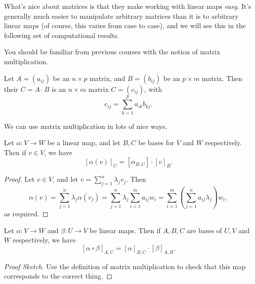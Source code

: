 What's nice about matrices is that they make working with linear maps \emph{easy}. It's generally much easier to manipulate arbitrary matrices than it is to arbitrary linear maps (of course, this varies from case to case), and we will see this in the following set of computational results.

You should be familiar from previous courses with the notion of matrix multiplication.

\begin{definition}
    Let $A = (a_{ij})$ be an $n \times p$ matrix, and $B = (b_{ij})$ 
    be an $p \times m$ matrix.
    Then their  $C = A\cdot B$ is an $n \times m$ matrix $C = (c_{ij})$, with
    $$
    c_{ij} = \sum_{k = 1}^p a_{ik}b_{kj}.
    $$
\end{definition}

We can use matrix multiplication in lots of nice ways.

\begin{lemma}
    Let $\alpha: V \rightarrow W$ be a linear map, and let $B, C$ be bases for $V$ and $W$ respectively. Then if $v \in V$, we have
    $$
    [\alpha(v)]_C = [\alpha_{B,C}] \cdot [v]_B.
    $$
\end{lemma}
\begin{proof}
    Let $v \in V$, and let $v = \sum_{j = 1}^n \lambda_j v_j$. Then
    $$
    \alpha(v) = \sum_{j = 1}^n \lambda_j \alpha(v_j) = \sum_{j = 1}^n \lambda_j \sum_{i = 1}^m a_{ij} w_i = \sum_{i = 1}^m \left(\sum_{j = 1}^n a_{ij} \lambda_j\right) w_i,
    $$
    as required.
\end{proof}

\begin{lemma}
    Let $\alpha: V \rightarrow W$ and $\beta: U \rightarrow V$ be linear maps. Then if $A, B, C$ are bases of $U, V$ and $W$ respectively, we have 
    $$
    [\alpha \circ \beta]_{A, C} = [\alpha]_{B, C} \cdot [\beta]_{A, B}.
    $$
\end{lemma}
\begin{proof}[Proof Sketch]
    Use the definition of matrix multiplication to check that this map corresponds to the correct thing.
\end{proof}



